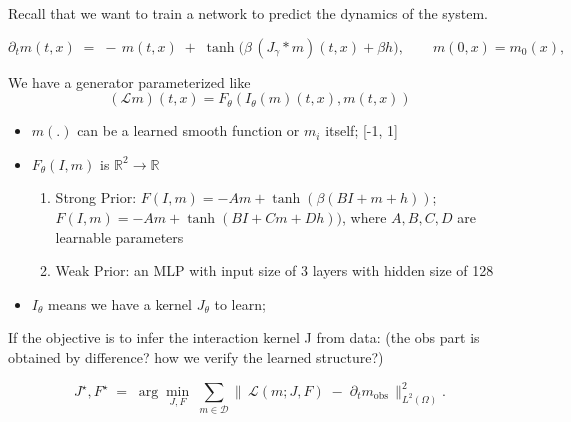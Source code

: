 \documentclass[11pt,a4paper]{article}
\begin{document}
Recall that we want to train a network to predict the dynamics of the system.

\begin{equation}\label{eq:nonlocal-recall}
\partial_t m(t,x) \;=\; -\,m(t,x)\;+\;\tanh\!\Big(\beta\, (J_\gamma * m)(t,x) + \beta h\Big), \qquad m(0,x)=m_0(x),
\end{equation}



We have a generator parameterized like
\begin{equation}
    (\mathcal{L}m)(t,x) = F_\theta(I_\theta (m)(t,x), m(t,x))
\end{equation}

\begin{itemize}
    \item $m(.)$ can be a learned smooth function or $m_i$ itself; [-1, 1]
    \item $F_\theta(I,m)$ is $\mathbb{R}^2 \to \mathbb{R}$
    \begin{enumerate}
        \item Strong Prior: $F(I, m)=-Am+\tanh(\beta(BI+m+h))$; $F(I, m)=-Am+\tanh(BI+Cm+Dh))$, where $A,B,C,D$ are learnable parameters
        \item Weak Prior: an MLP with input size of 3 layers with hidden size of 128
    \end{enumerate}
    \item $I_\theta$ means we have a kernel $J_\theta$ to learn;
\end{itemize}


If the objective is to infer the interaction kernel J from data: 
(the obs part is obtained by difference? how we verify the learned structure?)

$$
J^\star, F^\star \;=\; \arg\min_{J, F}\;
\sum_{m \in \mathcal{D}}
\bigl\|\, \mathcal{L}(m;J,F)\;-\;\partial_t m_{\mathrm{obs}} \,\bigr\|_{L^2(\Omega)}^{2}.
$$
\end{document}
